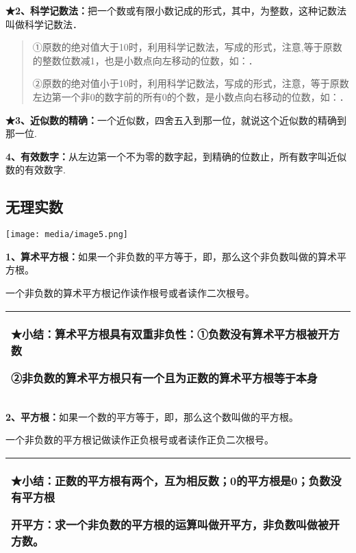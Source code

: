 \documentclass[a4paper,11pt,UTF8]{ctexart}
\begin{document}
\textbf{★2、科学记数法：}把一个数或有限小数记成的形式，其中，为整数，这种记数法叫做科学记数法．

\begin{quote}
①原数的绝对值大于10时，利用科学记数法，写成的形式，注意,等于原数的整数位数减1，也是小数点向左移动的位数，如：．

②原数的绝对值小于10时，利用科学记数法，写成的形式，注意，等于原数左边第一个非0的数字前的所有0的个数，是小数点向右移动的位数，如：．
\end{quote}

\textbf{★3、近似数的精确：}一个近似数，四舍五入到那一位，就说这个近似数的精确到那一位.

\textbf{4、有效数字：}从左边第一个不为零的数字起，到精确的位数止，所有数字叫近似数的有效数字.

\hypertarget{ux65e0ux7406ux5b9eux6570}{%
\subsection{\texorpdfstring{
无理实数}{ 无理实数}}\label{ux65e0ux7406ux5b9eux6570}}

\texttt{[image: media/image5.png]}

\textbf{1、算术平方根：}如果一个非负数的平方等于，即，那么这个非负数叫做的算术平方根。

一个非负数的算术平方根记作读作根号或者读作二次根号。

\begin{longtable}[]{@{}l@{}}
\toprule
\endhead
\begin{minipage}[t]{0.97\columnwidth}\raggedright
★小结：算术平方根具有双重非负性：①负数没有算术平方根被开方数

②非负数的算术平方根只有一个且为正数的算术平方根等于本身\strut
\end{minipage}\tabularnewline
\bottomrule
\end{longtable}

\textbf{2、平方根：}如果一个数的平方等于，即，那么这个数叫做的平方根。

一个非负数的平方根记做读作正负根号或者读作正负二次根号。

\begin{longtable}[]{@{}l@{}}
\toprule
\endhead
\begin{minipage}[t]{0.97\columnwidth}\raggedright
★小结：正数的平方根有两个，互为相反数；0的平方根是0；负数没有平方根

开平方：求一个非负数的平方根的运算叫做开平方，非负数叫做被开方数。\strut
\end{minipage}\tabularnewline
\bottomrule
\end{longtable}
\end{document}
